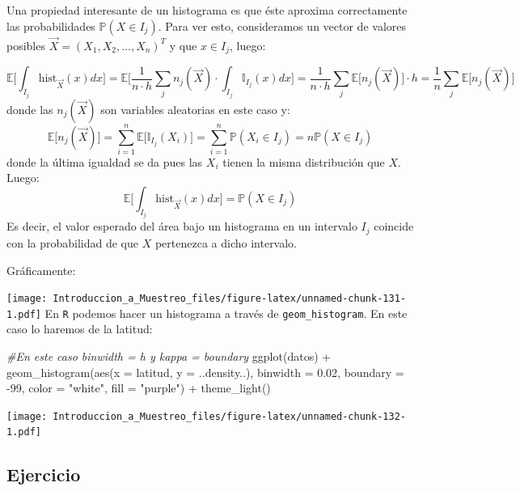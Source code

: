 \documentclass[
]{book}
\newenvironment{Shaded}{\begin{snugshade}}{\end{snugshade}}
\newcommand{\AttributeTok}[1]{\textcolor[rgb]{0.77,0.63,0.00}{#1}}
\newcommand{\CommentTok}[1]{\textcolor[rgb]{0.56,0.35,0.01}{\textit{#1}}}
\newcommand{\DecValTok}[1]{\textcolor[rgb]{0.00,0.00,0.81}{#1}}
\newcommand{\FloatTok}[1]{\textcolor[rgb]{0.00,0.00,0.81}{#1}}
\newcommand{\FunctionTok}[1]{\textcolor[rgb]{0.00,0.00,0.00}{#1}}
\newcommand{\NormalTok}[1]{#1}
\newcommand{\SpecialCharTok}[1]{\textcolor[rgb]{0.00,0.00,0.00}{#1}}
\newcommand{\StringTok}[1]{\textcolor[rgb]{0.31,0.60,0.02}{#1}}
\begin{document}
Una propiedad interesante de un histograma es que éste aproxima correctamente las probabilidades \(\mathbb{P}(X \in I_j)\). Para ver esto, consideramos un vector de valores posibles \(\vec{X} = (X_1, X_2, \dots, X_n)^T\) y que \(x\in I_j\), luego:

\[
\mathbb{E}\Big[ \int_{I_j} \text{hist}_{\vec{X}}(x) dx \Big] = \mathbb{E}\bigg[ \frac{1}{n \cdot h} \sum\limits_{j} n_j(\vec{X}) \cdot \int_{I_j} \mathbb{I}_{I_j}(x) dx \bigg] =  \frac{1}{n \cdot h} \sum\limits_{j} \mathbb{E}\big[ n_j(\vec{X}) \big] \cdot h  = \dfrac{1}{n}\sum\limits_{j} \mathbb{E}\big[ n_j(\vec{X}) \big]
\]
donde las \(n_j(\vec{X})\) son variables aleatorias en este caso y:
\[
\mathbb{E}\big[ n_j(\vec{X})\big] = \sum\limits_{i=1}^n \mathbb{E}\big[\mathbb{I}_{I_j}(X_i)\big] = \sum\limits_{i=1}^n\mathbb{P}(X_i \in I_j) = n \mathbb{P}(X \in I_j)
\]
donde la última igualdad se da pues las \(X_i\) tienen la misma distribución que \(X\). Luego:
\[
\mathbb{E}\Big[ \int_{I_j} \text{hist}_{\vec{X}}(x) dx \Big] = \mathbb{P}(X \in I_j)
\]
Es decir, el valor esperado del área bajo un histograma en un intervalo \(I_j\) coincide con la probabilidad de que \(X\) pertenezca a dicho intervalo.

Gráficamente:

\texttt{[image: Introduccion\_a\_Muestreo\_files/figure-latex/unnamed-chunk-131-1.pdf]}
En \texttt{R} podemos hacer un histograma a través de \texttt{geom\_histogram}. En este caso lo haremos de la latitud:

\begin{Shaded}
\begin{Highlighting}[]
\CommentTok{\#En este caso binwidth = h y kappa = boundary}
\FunctionTok{ggplot}\NormalTok{(datos) }\SpecialCharTok{+}
  \FunctionTok{geom\_histogram}\NormalTok{(}\FunctionTok{aes}\NormalTok{(}\AttributeTok{x =}\NormalTok{ latitud, }\AttributeTok{y =}\NormalTok{ ..density..), }
                 \AttributeTok{binwidth =} \FloatTok{0.02}\NormalTok{, }\AttributeTok{boundary =} \SpecialCharTok{{-}}\DecValTok{99}\NormalTok{,}
                 \AttributeTok{color =} \StringTok{"white"}\NormalTok{, }\AttributeTok{fill =} \StringTok{"purple"}\NormalTok{) }\SpecialCharTok{+}
  \FunctionTok{theme\_light}\NormalTok{() }
\end{Highlighting}
\end{Shaded}

\texttt{[image: Introduccion\_a\_Muestreo\_files/figure-latex/unnamed-chunk-132-1.pdf]}

\hypertarget{ejercicio-4}{%
\subsection{Ejercicio}\label{ejercicio-4}}
\end{document}
